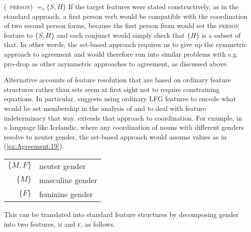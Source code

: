 \documentclass[output=paper,hidelinks]{langscibook}
\begin{document}
\ea\label{ex:Agreement:18}
(\UP\ \textsc{person}) $=_c \{S,H\}$
\z
If the target features were stated constructively, as in the standard
approach, a first person verb would be compatible with the
coordination of two second person forms, because the first person from would set the \textsc{person} feature to $\{S,H\}$ and each conjunct would simply check that $\{H\}$ is a subset of that. In other words, the set-based approach requires us to give up the symmetric approach to agreement and would therefore run into similar problems with e.g. pro-drop as other asymmetric approaches to agreement, as discussed above.

Alternative accounts of feature resolution that are based on ordinary
feature structures rather than sets seem at first sight not to require
constraining equations. In particular, \citet{DKS:Indeterminacy}
suggests using ordinary LFG features to encode what would be set
membership in the analysis of \citet{DalrympleKaplan2000} and to deal with
feature indeterminacy that way. \citet{Sadler:Underspecification}
extends that approach to coordination. For example, in a language like
Icelandic, where any coordination of nouns with different genders
resolve to neuter gender, the set-based approach would assume values
as in (\ref{ex:Agreement:19}).

\ea\label{ex:Agreement:19}
\begin{tabular}[t]{rl}
  $\{M,F\}$ & neuter gender \\
  $\{M\}$ &  masculine gender \\
  $\{F\}$ &  feminine gender \\
\end{tabular}
\z
This can be translated into standard feature structures by decomposing
gender into two features, \textsc{m} and \textsc{f}, as follows.
\end{document}
